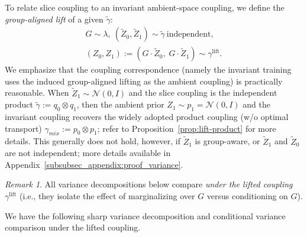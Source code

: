 \documentclass{article}
\theoremstyle{plain}
\theoremstyle{definition}
\theoremstyle{remark}
\newtheorem{remark}[theorem]{Remark}
\newcommand{\1}{\mathbf{1}}
\begin{document}
To relate slice coupling to an invariant ambient-space coupling, we define the \emph{group-aligned lift} of a given $\widetilde\gamma$:
\begin{equation}
\label{eq:group-aligned-lift}
\begin{aligned}
G\sim\lambda,\ (\widetilde Z_0,\widetilde Z_1)\sim \widetilde\gamma\ \text{independent},\\
(Z_0,Z_1):=(G\cdot \widetilde Z_0,\; G\cdot \widetilde Z_1)\sim \gamma^{\mathrm{lift}}.
\end{aligned}
\end{equation}
We emphasize that the coupling correspondence (namely the invariant training uses the induced group-aligned lifting as the ambient coupling) is practically reasonable.
When $\tilde Z_1\sim \mathcal N(0, I)$ and the slice coupling is the independent product $\tilde \gamma:=q_0\otimes q_1$, then the ambient prior $Z_1\sim p_1=\mathcal{N}(0,I)$ and the invariant coupling recovers the widely adopted product coupling (w/o optimal transport) $\gamma_{mix}:=p_0\otimes p_1$; refer to Proposition~\ref{prop:lift-product} for more details.
This generally does not hold, however, if $\tilde Z_1$ is group-aware, or $\tilde Z_1$ and $\tilde Z_0$ are not independent; more details available in Appendix~\ref{subsubsec_appendix:proof_variance}.


\begin{remark}
All variance decompositions below compare \emph{under the lifted coupling} $\gamma^{\mathrm{lift}}$ (i.e., they isolate the effect of marginalizing over $G$ versus conditioning on $G$).
\end{remark}
We have the following sharp variance decomposition and conditional variance comparison under the lifted coupling.
\end{document}
